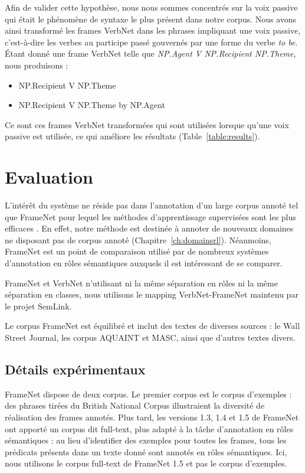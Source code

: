 Afin de valider cette hypothèse, nous nous sommes concentrés sur la voix
passive qui était le phénomène de syntaxe le plus présent dans notre corpus.
Nous avons ainsi transformé les frames VerbNet dans les phrases impliquant une
voix passive, c'est-à-dire les verbes au participe passé gouvernés par une
forme du verbe \emph{to be}. Étant donné une frame VerbNet telle que
\emph{NP.Agent V NP.Recipient NP.Theme}, nous produisons :

\begin{itemize}
    \item NP.Recipient V NP.Theme
    \item NP.Recipient V NP.Theme by NP.Agent
\end{itemize}

Ce sont ces frames VerbNet transformées qui sont utilisées lorsque qu'une voix
passive est utilisée, ce qui améliore les résultats (Table~\ref{table:results}).

\section{Evaluation}
\label{srl:evaluation}

L'intérêt du système ne réside pas dans l'annotation d'un large corpus annoté
tel que FrameNet pour lequel les méthodes d'apprentissage supervisées sont les
plus efficaces \citep{das2014frame}. En effet, notre méthode est destinée à
annoter de nouveaux domaines ne disposant pas de corpus annoté
(Chapitre~\ref{ch:domainsrl}). Néanmoins, FrameNet est un point de comparaison
utilisé par de nombreux systèmes d'annotation en rôles sémantiques auxquels il
est intéressant de se comparer.

FrameNet et VerbNet n'utilisant ni la même séparation en rôles ni la même
séparation en classes, nous utilisons le mapping VerbNet-FrameNet maintenu par
le projet SemLink.

Le corpus FrameNet est équilibré et inclut des textes de diverses sources : le
Wall Street Journal, les corpus AQUAINT et MASC, ainsi que d'autres textes
divers.

\subsection{Détails expérimentaux}
\label{subsec:details_exp}

FrameNet dispose de deux corpus. Le premier corpus est le corpus d'exemples :
des phrases tirées du British National Corpus illustraient la diversité de
réalisation des frames annotés. Plus tard, les versions 1.3, 1.4 et 1.5 de
FrameNet ont apporté un corpus dit full-text, plus adapté à la tâche
d'annotation en rôles sémantiques : au lieu d'identifier des exemples pour
toutes les frames, tous les prédicats présents dans un texte donné sont annotés
en rôles sémantiques. Ici, nous utilisons le corpus full-text de FrameNet 1.5
et pas le corpus d'exemples.


